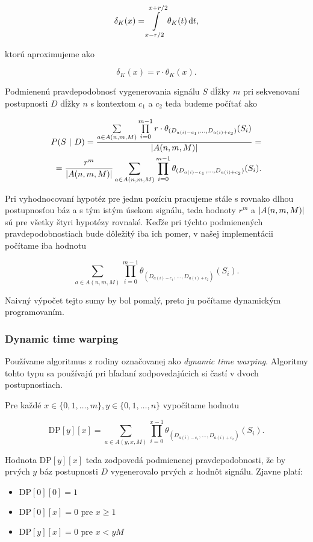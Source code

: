 $$\delta_K(x) = \int\limits_{x-r/2}^{x+r/2} \theta_K(t) \diff t \text{,}$$

ktorú aproximujeme ako 

$$\delta_K(x) = r \cdot \theta_K(x) \text{.}$$

Podmienenú pravdepodobnosť vygenerovania signálu $S$ dĺžky $m$ pri sekvenovaní postupnosti $D$ dĺžky $n$ s kontextom 
$c_1$ a $c_2$ teda budeme počítať ako

\begin{align*}
P(S ~|~ D) = \frac{\sum\limits_{a \in A(n, m, M)} \prod\limits_{i=0}^{m-1} r \cdot \theta_{(D_{a(i)-c_1}, \dots, D_{a(i)+c_2})}(S_i)}{\abs*{A(n, m, M)}} = \\
= \frac{r^m}{\abs*{A(n, m, M)}} \sum\limits_{a \in A(n, m, M)} \prod\limits_{i=0}^{m-1} \theta_{(D_{a(i)-c_1}, \dots, D_{a(i)+c_2})}(S_i) \text{.} 
\end{align*}

Pri vyhodnocovaní hypotéz pre jednu pozíciu pracujeme stále s rovnako dlhou postupnosťou báz a s tým istým úsekom signálu, teda hodnoty
$r^m$ a $\abs*{A(n, m, M)}$ sú pre všetky štyri hypotézy rovnaké. Keďže pri týchto podmienených pravdepodobnostiach bude dôležitý iba ich
pomer, v našej implementácii počítame iba hodnotu

$$\sum\limits_{a \in A(n, m, M)} \prod\limits_{i=0}^{m-1} \theta_{(D_{a(i)-c_1}, \dots, D_{a(i)+c_2})}(S_i) \text{.}$$

Naivný výpočet tejto sumy by bol pomalý, preto ju počítame dynamickým programovaním.


\subsubsection{Dynamic time warping}
\label{sec:dtw}

Používame algoritmus z rodiny označovanej ako \emph{dynamic time warping}. Algoritmy tohto typu sa používajú pri hľadaní
zodpovedajúcich si častí v dvoch postupnostiach\cite{DynamicTimeWarping}.

Pre každé $x \in \{0, 1, \dots, m\}, y \in \{0, 1, \dots, n\}$ vypočítame hodnotu

$$\textrm{DP}[y][x] = \sum\limits_{a \in A(y, x, M)} \prod\limits_{i=0}^{x-1} \theta_{(D_{a(i)-c_1}, \dots, D_{a(i)+c_2})}(S_i) \text{.}$$

Hodnota $\textrm{DP}[y][x]$ teda zodpovedá podmienenej pravdepodobnosti, že by prvých $y$ báz postupnosti $D$ vygenerovalo prvých $x$ hodnôt signálu.
Zjavne platí:
\begin{itemize}
\item $\textrm{DP}[0][0] = 1$
\item $\textrm{DP}[0][x] = 0$ pre $x \geq 1$
\item $\textrm{DP}[y][x] = 0$ pre $x < y M$
\end{itemize} 

